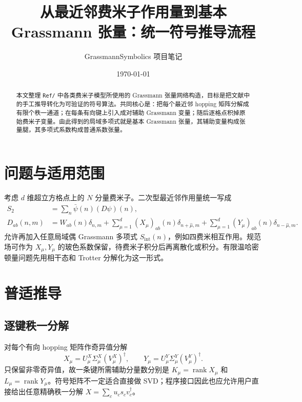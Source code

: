 \documentclass[UTF8,11pt]{ctexart}
\title{从最近邻费米子作用量到基本 Grassmann 张量：统一符号推导流程}
\author{GrassmannSymbolics 项目笔记}
\date{\today}
\newcommand{\bpsi}{\bar\psi}
\begin{document}
\maketitle

\begin{abstract}
本文整理 \texttt{Ref/} 中各类费米子模型所使用的 Grassmann 张量网络构造，目标是把文献中的手工推导转化为可验证的符号算法。共同核心是：把每个最近邻 hopping 矩阵分解成有限个秩一通道；在每条有向键上引入成对辅助 Grassmann 变量；随后逐格点积掉原始费米子变量。由此得到的局域多项式就是基本 Grassmann 张量，其辅助变量构成张量腿，其多项式系数构成普通系数张量。
\end{abstract}

\section{问题与适用范围}
考虑 $d$ 维超立方格点上的 $N$ 分量费米子。二次型最近邻作用量统一写成
\begin{align}
 S_2 &= \sum_n \bpsi(n)(D\psi)(n),\\
 D_{ab}(n,m) &= W_{ab}(n)\delta_{n,m}
 + \sum_{\mu=1}^d (X_\mu)_{ab}(n)\delta_{n+\hat\mu,m}
 + \sum_{\mu=1}^d (Y_\mu)_{ab}(n)\delta_{n-\hat\mu,m}.
\end{align}
允许再加入任意局域偶 Grassmann 多项式 $S_{\mathrm{int}}(n)$，例如四费米相互作用。规范场可作为 $X_\mu,Y_\mu$ 的玻色系数保留，待费米子积分后再离散化或积分。有限温哈密顿量问题先用相干态和 Trotter 分解化为这一形式。

\section{普适推导}
\subsection{逐键秩一分解}
对每个有向 hopping 矩阵作奇异值分解
\begin{equation}
 X_\mu=U^X_\mu\Sigma^X_\mu(V^X_\mu)^\dagger,
 \qquad
 Y_\mu=U^Y_\mu\Sigma^Y_\mu(V^Y_\mu)^\dagger.
\end{equation}
只保留非零奇异值，故一条键所需辅助分量数分别是
$K_\mu=\operatorname{rank}X_\mu$ 和 $L_\mu=\operatorname{rank}Y_\mu$。符号矩阵不一定适合直接做 SVD；程序接口因此也应允许用户直接给出任意精确秩一分解 $X=\sum_c u_c s_c v_c^\dagger$。
\end{document}
